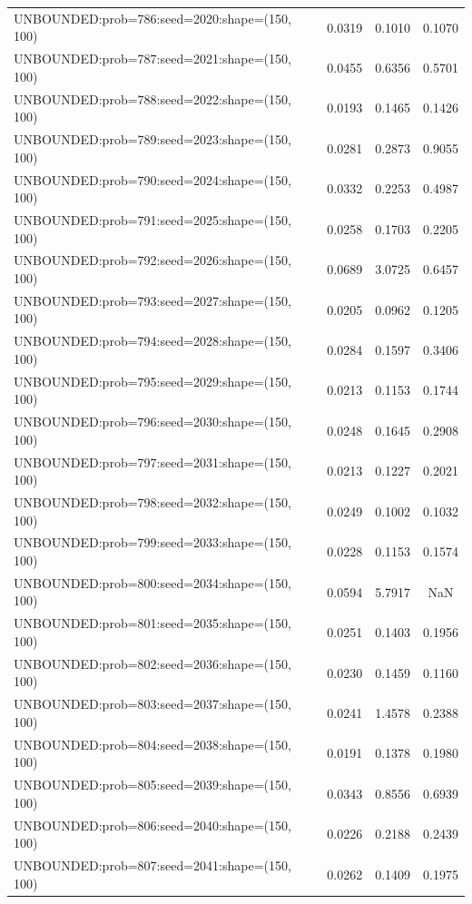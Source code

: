 \begin{longtable}{lccc}
UNBOUNDED:prob=786:seed=2020:shape=(150, 100) &   0.0319 &  0.1010 &  0.1070 \\
UNBOUNDED:prob=787:seed=2021:shape=(150, 100) &   0.0455 &  0.6356 &  0.5701 \\
UNBOUNDED:prob=788:seed=2022:shape=(150, 100) &   0.0193 &  0.1465 &  0.1426 \\
UNBOUNDED:prob=789:seed=2023:shape=(150, 100) &   0.0281 &  0.2873 &  0.9055 \\
UNBOUNDED:prob=790:seed=2024:shape=(150, 100) &   0.0332 &  0.2253 &  0.4987 \\
UNBOUNDED:prob=791:seed=2025:shape=(150, 100) &   0.0258 &  0.1703 &  0.2205 \\
UNBOUNDED:prob=792:seed=2026:shape=(150, 100) &   0.0689 &  3.0725 &  0.6457 \\
UNBOUNDED:prob=793:seed=2027:shape=(150, 100) &   0.0205 &  0.0962 &  0.1205 \\
UNBOUNDED:prob=794:seed=2028:shape=(150, 100) &   0.0284 &  0.1597 &  0.3406 \\
UNBOUNDED:prob=795:seed=2029:shape=(150, 100) &   0.0213 &  0.1153 &  0.1744 \\
UNBOUNDED:prob=796:seed=2030:shape=(150, 100) &   0.0248 &  0.1645 &  0.2908 \\
UNBOUNDED:prob=797:seed=2031:shape=(150, 100) &   0.0213 &  0.1227 &  0.2021 \\
UNBOUNDED:prob=798:seed=2032:shape=(150, 100) &   0.0249 &  0.1002 &  0.1032 \\
UNBOUNDED:prob=799:seed=2033:shape=(150, 100) &   0.0228 &  0.1153 &  0.1574 \\
UNBOUNDED:prob=800:seed=2034:shape=(150, 100) &   0.0594 &  5.7917 &     NaN \\
UNBOUNDED:prob=801:seed=2035:shape=(150, 100) &   0.0251 &  0.1403 &  0.1956 \\
UNBOUNDED:prob=802:seed=2036:shape=(150, 100) &   0.0230 &  0.1459 &  0.1160 \\
UNBOUNDED:prob=803:seed=2037:shape=(150, 100) &   0.0241 &  1.4578 &  0.2388 \\
UNBOUNDED:prob=804:seed=2038:shape=(150, 100) &   0.0191 &  0.1378 &  0.1980 \\
UNBOUNDED:prob=805:seed=2039:shape=(150, 100) &   0.0343 &  0.8556 &  0.6939 \\
UNBOUNDED:prob=806:seed=2040:shape=(150, 100) &   0.0226 &  0.2188 &  0.2439 \\
UNBOUNDED:prob=807:seed=2041:shape=(150, 100) &   0.0262 &  0.1409 &  0.1975 \\

\end{longtable}
